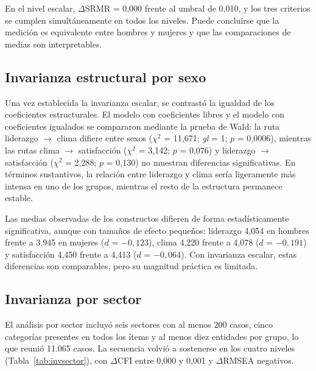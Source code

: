 \documentclass[11pt,a4paper]{article}
\newcommand{\df}{\textit{gl}}
\begin{document}
En el nivel escalar, $\Delta$SRMR = 0,000 frente al umbral de 0,010, y los tres criterios se
cumplen simultáneamente en todos los niveles. Puede concluirse que la medición es
equivalente entre hombres y mujeres y que las comparaciones de medias son interpretables.

\subsection{Invarianza estructural por sexo}

Una vez establecida la invarianza escalar, se contrastó la igualdad de los coeficientes
estructurales. El modelo con coeficientes libres y el modelo con coeficientes igualados se
compararon mediante la prueba de Wald: la ruta liderazgo $\rightarrow$ clima difiere entre
sexos ($\chi^2$ = 11,671; \df{} = 1; $p$ = 0,0006), mientras las rutas clima
$\rightarrow$ satisfacción ($\chi^2$ = 3,142; $p$ = 0,076) y liderazgo $\rightarrow$
satisfacción ($\chi^2$ = 2,288; $p$ = 0,130) no muestran diferencias significativas. En
términos sustantivos, la relación entre liderazgo y clima sería ligeramente más intensa en
uno de los grupos, mientras el resto de la estructura permanece estable.

Las medias observadas de los constructos difieren de forma estadísticamente significativa,
aunque con tamaños de efecto pequeños: liderazgo 4,054 en hombres frente a 3,945 en mujeres
($d$ = $-0,123$), clima 4,220 frente a 4,078 ($d$ = $-0,191$) y satisfacción 4,450 frente a
4,413 ($d$ = $-0,064$). Con invarianza escalar, estas diferencias son comparables, pero su
magnitud práctica es limitada.

\subsection{Invarianza por sector}

El análisis por sector incluyó seis sectores con al menos 200 casos, cinco categorías
presentes en todos los ítems y al menos diez entidades por grupo, lo que reunió 11.065 casos.
La secuencia volvió a sostenerse en los cuatro niveles (Tabla~\ref{tab:invsector}), con
$\Delta$CFI entre 0,000 y 0,001 y $\Delta$RMSEA negativos.
\end{document}
